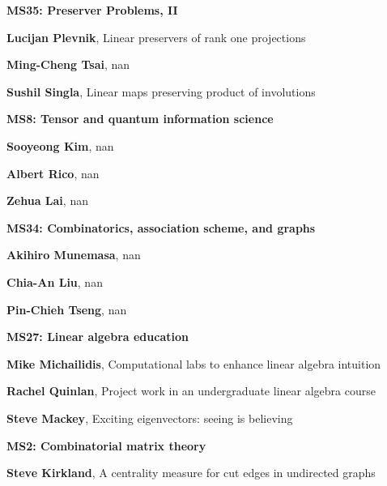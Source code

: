 \documentclass[ILAS2025-program.tex]{subfiles}
\begin{document}
\begin{description}
\begin{description}
        \end{description}
    \begin{description}
    \item[] {\color{mstitle}\textbf{MS35: Preserver Problems, II}} 
    \item[] \textbf{Lucijan Plevnik}, Linear preservers of rank one projections
        \item[] \textbf{Ming-Cheng Tsai}, nan
        \item[] \textbf{Sushil Singla}, Linear maps preserving product of involutions
        \end{description}
    \begin{description}
    \item[] {\color{mstitle}\textbf{MS8: Tensor and quantum information science}} 
    \item[] \textbf{Sooyeong Kim}, nan
        \item[] \textbf{Albert Rico}, nan
        \item[] \textbf{Zehua Lai}, nan
        \end{description}
    \begin{description}
    \item[] {\color{mstitle}\textbf{MS34: Combinatorics, association scheme, and graphs}} 
    \item[] \textbf{Akihiro Munemasa}, nan
        \item[] \textbf{Chia-An Liu}, nan
        \item[] \textbf{Pin-Chieh Tseng}, nan
        \end{description}
    \begin{description}
    \item[] {\color{mstitle}\textbf{MS27: Linear algebra education}} 
    \item[] \textbf{Mike Michailidis}, Computational labs to enhance linear algebra intuition
        \item[] \textbf{Rachel Quinlan}, Project work in an undergraduate linear algebra course
        \item[] \textbf{Steve Mackey}, Exciting eigenvectors: seeing is believing
        \end{description}
    \begin{description}
    \item[] {\color{mstitle}\textbf{MS2: Combinatorial matrix theory}} 
    \item[] \textbf{Steve Kirkland}, A centrality measure for cut edges in undirected graphs


\end{description}
\end{description}
\end{document}
